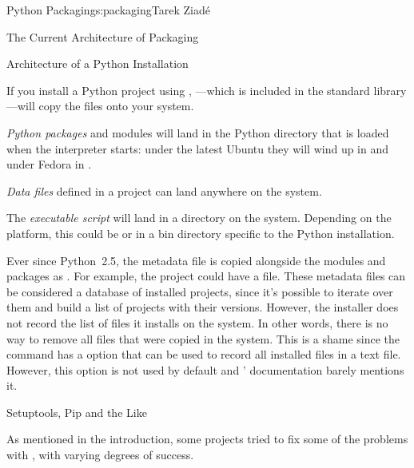 \begin{aosachapter}{Python Packaging}{s:packaging}{Tarek Ziad\'{e}}
\begin{aosasect1}{The Current Architecture of Packaging}
\begin{aosasect2}{Architecture of a Python Installation}

If you install a Python project using ,
---which is included in the standard library---will
copy the files onto your system.

\begin{aosaitemize}

  \item \emph{Python packages} and modules will land in the Python
  directory that is loaded when the interpreter starts: under the
  latest Ubuntu they will wind up in
   and under Fedora in
  .

  \item \emph{Data files} defined in a project can land anywhere
  on the system.

  \item The \emph{executable script} will land in a  directory
  on the system. Depending on the platform, this could be
   or in a bin directory specific to the Python
  installation.

\end{aosaitemize}

Ever since Python~2.5, the metadata file is copied alongside the modules
and packages as . For example, the
 project could have a
 file.  These metadata files can be
considered a database of installed projects, since it's possible to
iterate over them and build a list of projects with their versions.
However, the  installer does not record the list of
files it installs on the system.  In other words, there is no way to
remove all files that were copied in the system.  This is a shame
since the  command has a  option that can
be used to record all installed files in a text file. However, this
option is not used by default and ' documentation
barely mentions it.

\end{aosasect2}

\begin{aosasect2}{Setuptools, Pip and the Like}

As mentioned in the introduction, some projects tried to fix some of
the problems with , with varying degrees of success.


\end{aosasect2}
\end{aosasect1}
\end{aosachapter}
